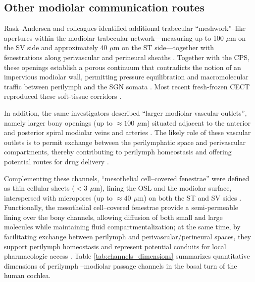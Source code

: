 \documentclass[referee,pdflatex, sn-vancouver-num]{sn-jnl}%
\theoremstyle{thmstyleone}%
\theoremstyle{thmstyletwo}%
\theoremstyle{thmstylethree}%
\newcommand{\um}{\ensuremath{\,\mu\mathrm{m}}}
\DeclareRobustCommand{\textendash}{\ifmmode\text{-}\else\leavevmode\hbox{--}\fi}
\begin{document}
\subsection{Other modiolar communication routes}
Rask\textendash Andersen and colleagues identified additional trabecular “meshwork”–like apertures within the modiolar trabecular network—measuring up to 100 $\mu \mathrm{m}$ on the SV side and approximately 40 $\mu\mathrm{m}$ on the ST side—together with fenestrations along perivascular and perineural sheaths \cite{raskandersen2006}. Together with the CPS, these openings establish a porous continuum that contradicts the notion of an impervious modiolar wall, permitting pressure equilibration and macromolecular traffic between perilymph and the SGN somata \cite{raskandersen2006, shepherd2004}. Most recent fresh-frozen CECT reproduced these soft-tissue corridors \cite{Starovoyt2023_SciRep_CochlearMicrostructures}.

In addition, the same investigators described “larger modiolar vascular outlets”, namely larger bony openings (up to $\approx \SI{100}{\um}$) situated adjacent to the anterior and posterior spiral modiolar veins and arteries \cite{raskandersen2006, shepherd2004}. The likely role of these vascular outlets is to permit exchange between the perilymphatic space and perivascular compartments, thereby contributing to perilymph homeostasis and offering potential routes for drug delivery \cite{raskandersen2006, shepherd2004}.

Complementing these channels, “mesothelial cell–covered fenestrae” were defined as thin cellular sheets ($< \SI{3}{\um}$), lining the OSL and the modiolar surface, interspersed with micropores (up to $\approx \SI{40}{\um}$) on both the ST and SV sides \cite{raskandersen2006, shepherd2004}. Functionally, the mesothelial cell–covered fenestrae provide a semi-permeable lining over the bony channels, allowing diffusion of both small and large molecules while maintaining fluid compartmentalization; at the same time, by facilitating exchange between perilymph and perivascular/perineural spaces, they support perilymph homeostasis and represent potential conduits for local pharmacologic access \cite{raskandersen2006, shepherd2004}. Table \ref{tab:channels_dimensions} summarizes quantitative dimensions of perilymph \textendash modiolar passage channels in the basal turn of the human cochlea. 
\end{document}
